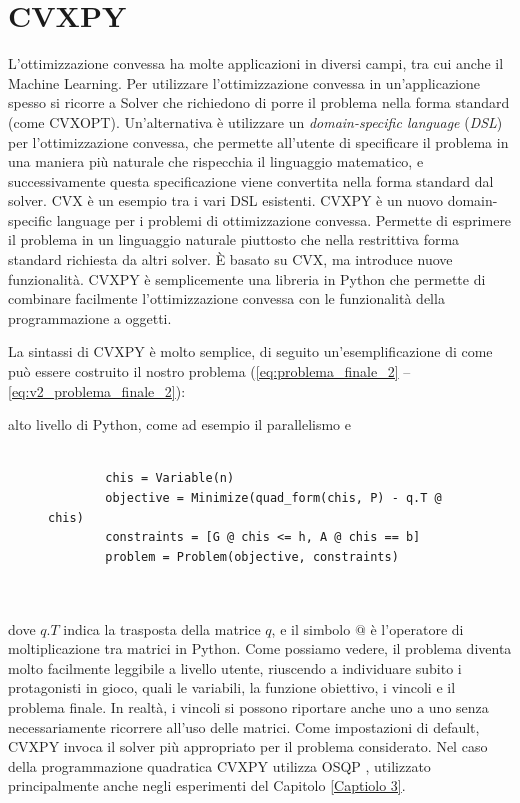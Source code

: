 \documentclass[a4paper,12pt]{report}
\begin{document}
\section{CVXPY}
L'ottimizzazione convessa ha molte applicazioni in diversi campi, tra cui anche il Machine Learning. Per utilizzare l'ottimizzazione convessa in un'applicazione spesso si ricorre a Solver che richiedono di porre il problema nella forma standard (come CVXOPT). Un'alternativa è utilizzare un \textit{domain-specific language} (\textit{DSL}) per l'ottimizzazione convessa, che permette all'utente di specificare il problema in una maniera più naturale che rispecchia il linguaggio matematico, e successivamente questa specificazione viene convertita nella forma standard dal solver. CVX \cite{cvx} è un esempio tra i vari DSL esistenti.
CVXPY \cite{CVXPY_1} \cite{CVXPY_2} è un nuovo domain-specific language per i problemi di ottimizzazione convessa. Permette di esprimere il problema in un linguaggio naturale piuttosto che nella restrittiva forma standard richiesta da altri solver. \`E basato su CVX, ma introduce nuove funzionalità. CVXPY è semplicemente una libreria in Python che permette di combinare facilmente l'ottimizzazione convessa con le funzionalità della programmazione a oggetti.

La sintassi di CVXPY è molto semplice, di seguito un'esemplificazione di come può essere costruito il nostro problema (\ref{eq:problema_finale_2} -- \ref{eq:v2_problema_finale_2}):

alto livello di Python, come ad esempio il parallelismo e\begin{figure}[H]
    \begin{verbatim}

        chis = Variable(n)
        objective = Minimize(quad_form(chis, P) - q.T @ chis)
        constraints = [G @ chis <= h, A @ chis == b]
        problem = Problem(objective, constraints)
        
        
    \end{verbatim}
\end{figure}

\noindent dove $q.T$ indica la trasposta della matrice $q$, e il simbolo $@$ è l'operatore di moltiplicazione tra matrici in Python. Come possiamo vedere, il problema diventa molto facilmente leggibile a livello utente, riuscendo a individuare subito i protagonisti in gioco, quali le variabili, la funzione obiettivo, i vincoli e il problema finale. In realtà, i vincoli si possono riportare anche uno a uno senza necessariamente ricorrere all'uso delle matrici.
Come impostazioni di default, CVXPY invoca il solver più appropriato per il problema considerato. Nel caso della programmazione quadratica CVXPY utilizza OSQP \cite{osqp}, utilizzato principalmente anche negli esperimenti del Capitolo \ref{Captiolo 3}.
\end{document}
